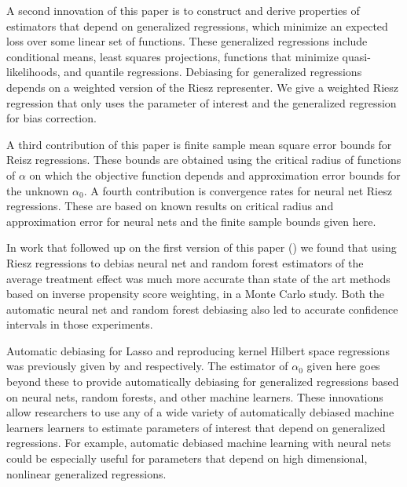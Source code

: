 \documentclass[aos]{imsart}
\numberwithin{equation}{section}
\theoremstyle{plain}
\theoremstyle{remark}
\begin{document}
A second innovation of this paper is to construct and derive properties of estimators that depend on generalized regressions, which minimize an expected loss over some linear set of functions. 
These generalized regressions include conditional means, least squares projections, functions that minimize quasi-likelihoods, and quantile regressions.
Debiasing for generalized regressions depends on a weighted version of the Riesz representer. 
We give a weighted Riesz regression that only uses the parameter of interest and the generalized regression for bias correction.

A third contribution of this paper is finite sample mean square error bounds for Reisz regressions. 
These bounds are obtained using the critical radius of functions of $\alpha$ on which the objective function depends and approximation error bounds for the unknown $\alpha_0$. 
A fourth contribution is convergence rates for neural net Riesz regressions.
These are based on known results on critical radius and approximation error for neural nets and the finite sample bounds given here.

In work that followed up on the first version of this paper (\cite{chernozhukov2022riesznet}) we found that using Riesz regressions to debias neural net and random forest estimators of the average treatment effect was much more accurate than state of the art methods based on inverse propensity score weighting, in a Monte Carlo study.
Both the automatic neural net and random forest debiasing also led to accurate confidence intervals in those experiments.

Automatic debiasing for Lasso and reproducing kernel Hilbert space regressions was previously given by \cite{chernozhukov2022automatic} and \cite{singh2022kernel} respectively. 
The estimator of $\alpha_0$ given here goes beyond these to provide automatically debiasing for generalized regressions based on neural nets, random forests, and other machine learners. 
These innovations allow researchers to use any of a wide variety of automatically debiased machine learners learners to estimate parameters of interest that depend on generalized regressions. 
For example, automatic debiased machine learning with neural nets could be especially useful for parameters that depend on  high dimensional, nonlinear generalized regressions.
\end{document}
